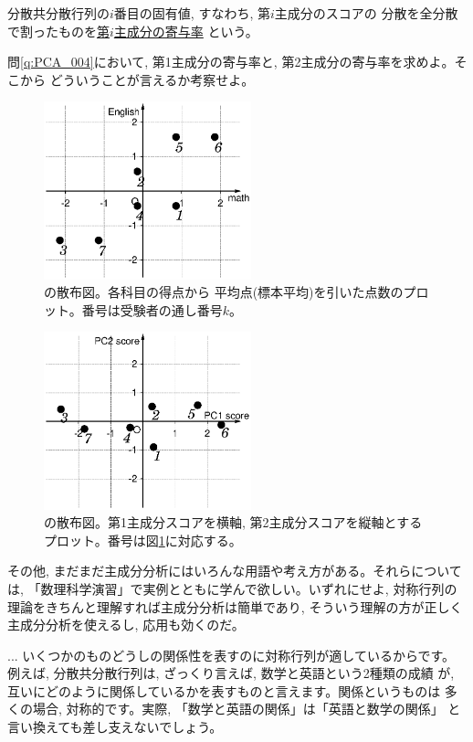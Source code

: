 分散共分散行列の$i$番目の固有値, すなわち, 第$i$主成分のスコアの
分散を全分散で割ったものを\underline{第$i$主成分の寄与率}
という。\\

\begin{q}\label{q:PCA_012} 問\ref{q:PCA_004}において, 
第1主成分の寄与率と, 第2主成分の寄与率を求めよ。そこから
どういうことが言えるか考察せよ。\end{q}

\begin{figure}
    \centering
    \includegraphics[width=6cm]{PCA_plot1.eps}
    \caption{の散布図。各科目の得点から
平均点(標本平均)を引いた点数のプロット。番号は受験者の通し番号$k$。\label{fig:PCA_plot1}}
\end{figure}

\begin{figure}
    \centering
    \includegraphics[width=6cm]{PCA_plot2.eps}
    \caption{の散布図。第1主成分スコアを横軸, 
第2主成分スコアを縦軸とするプロット。番号は図\ref{fig:PCA_plot1}に対応する。\label{fig:PCA_plot2}}
\end{figure}

その他, まだまだ主成分分析にはいろんな用語や考え方がある。それらについては, 
「数理科学演習」で実例とともに学んで欲しい。いずれにせよ, 
対称行列の理論をきちんと理解すれば主成分分析は簡単であり, 
そういう理解の方が正しく主成分分析を使えるし, 応用も効くのだ。

\begin{faq}{\small{}
 ... いくつかのものどうしの関係性を表すのに対称行列が適しているからです。
例えば, 分散共分散行列は, ざっくり言えば, 数学と英語という2種類の成績
が, 互いにどのように関係しているかを表すものと言えます。関係というものは
多くの場合, 対称的です。実際, 「数学と英語の関係」は「英語と数学の関係」
と言い換えても差し支えないでしょう。}\end{faq}
\mv


